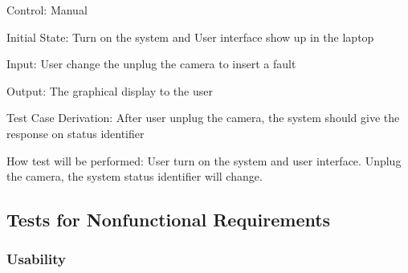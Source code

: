 \documentclass[12pt, titlepage]{article}
\begin{document}
\begin{enumerate}
Control: Manual
					
Initial State: Turn on the system and User interface show up in the laptop
					
Input: User change the unplug the camera to insert a fault
					
Output: The graphical display to the user

Test Case Derivation: After user unplug the camera, the system should give the response on status identifier
					
How test will be performed: 
	User turn on the system and user interface. Unplug the camera, the system status identifier will change.
\end{enumerate}

\subsection{Tests for Nonfunctional Requirements}




\subsubsection{Usability}
		
\end{document}
